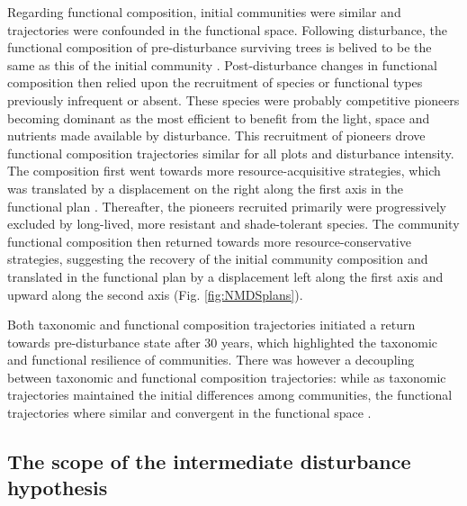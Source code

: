 \documentclass[fleqn,10pt]{ArtEcoFoG} %
\begin{document}
Regarding functional composition, initial communities were similar and
trajectories were confounded in the functional space. Following
disturbance, the functional composition of pre-disturbance surviving
trees is belived to be the same as this of the initial community
\citep{Herault2018}. Post-disturbance changes in functional composition
then relied upon the recruitment of species or functional types
previously infrequent or absent. These species were probably competitive
pioneers becoming dominant as the most efficient to benefit from the
light, space and nutrients made available by disturbance. This
recruitment of pioneers drove functional composition trajectories
similar for all plots and disturbance intensity. The composition first
went towards more resource-acquisitive strategies, which was translated
by a displacement on the right along the first axis in the functional
plan \citep{Westoby1998, Wright2004, Reich2014}. Thereafter, the
pioneers recruited primarily were progressively excluded by long-lived,
more resistant and shade-tolerant species. The community functional
composition then returned towards more resource-conservative strategies,
suggesting the recovery of the initial community composition and
translated in the functional plan by a displacement left along the first
axis and upward along the second axis (Fig. \ref{fig:NMDSplans}).

Both taxonomic and functional composition trajectories initiated a
return towards pre-disturbance state after 30 years, which highlighted
the taxonomic and functional resilience of communities. There was
however a decoupling between taxonomic and functional composition
trajectories: while as taxonomic trajectories maintained the initial
differences among communities, the functional trajectories where similar
and convergent in the functional space \citep{Fukami2005}.

\subsection{The scope of the intermediate disturbance
hypothesis}\label{the-scope-of-the-intermediate-disturbance-hypothesis}
\end{document}
